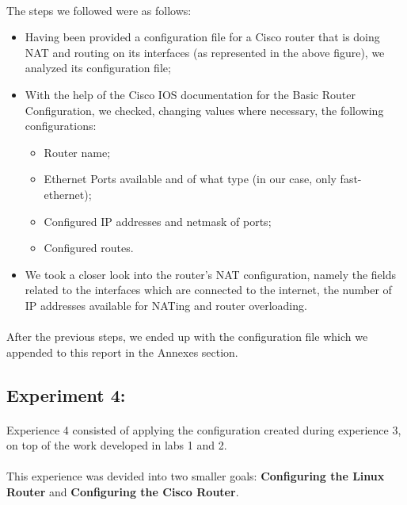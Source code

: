 \documentclass[11pt]{article}
\begin{document}
\paragraph{}The steps we followed were as follows:

\begin{itemize}
    \item Having been provided a configuration file for a Cisco router that is doing NAT and routing on its interfaces (as represented in the above figure), we analyzed its configuration file;
    \item With the help of the Cisco IOS documentation for the Basic Router Configuration, we checked, changing values where necessary, the following configurations:
        \begin{itemize}
            \item Router name;
            \item Ethernet Ports available and of what type (in our case, only fast-ethernet);
            \item Configured IP addresses and netmask of ports;
            \item Configured routes.
        \end{itemize}
    \item We took a closer look into the router's NAT configuration, namely the fields related to the interfaces which are connected to the internet, the number of IP addresses available for NATing and router overloading.
\end{itemize}

\paragraph{}After the previous steps, we ended up with the configuration file which we appended to this report in the Annexes section.

\subsection*{Experiment 4:}

\paragraph{}Experience 4 consisted of applying the configuration created during experience 3, on top of the work developed in labs 1 and 2.

\paragraph{}This experience was devided into two smaller goals: \textbf{Configuring the Linux Router} and \textbf{Configuring the Cisco Router}.
\end{document}
